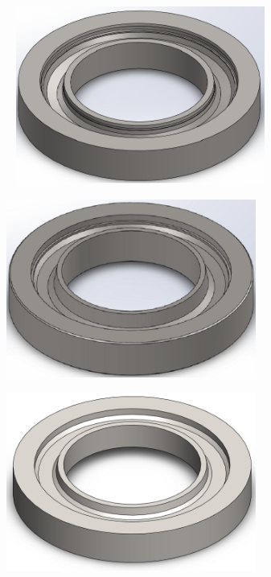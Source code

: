 \begin{figure}[htb]
    \centering
    \begin{subfigure}{.33\textwidth}\
        \centering
        \includegraphics[width = 0.9\textwidth]{Figures/Cap3/CAD_DB35.png}
        \caption{}
        \label{fig:CAD_DB35}
    \end{subfigure}%
    \centering
    \begin{subfigure}{.33\textwidth}
        \centering
        \includegraphics[width = 0.9\textwidth]{Figures/Cap3/CAD_DB45.png}
        \caption{}
        \label{fig:CAD_DB45}
    \end{subfigure}
    \centering
    \begin{subfigure}{.33\textwidth}
        \centering
        \includegraphics[width = 0.9\textwidth]{Figures/Cap3/CAD_JT4.png}

\end{subfigure}
\end{figure}
